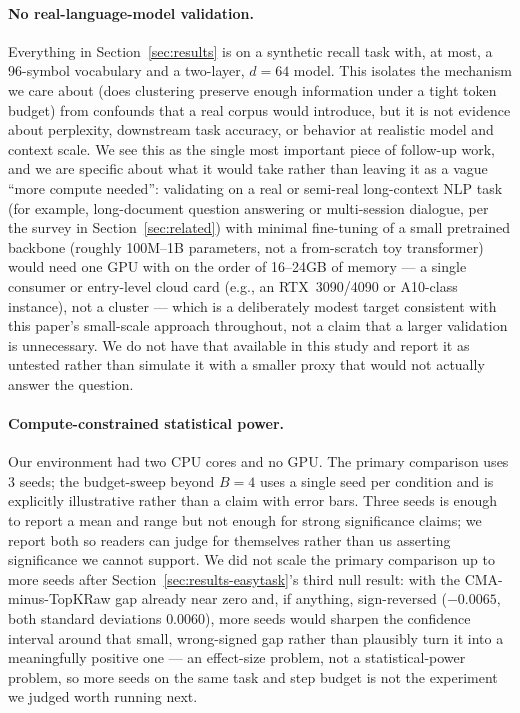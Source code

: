 \documentclass[11pt]{article}
\begin{document}
\paragraph{No real-language-model validation.} Everything in Section~\ref{sec:results} is on a
synthetic recall task with, at most, a 96-symbol vocabulary and a two-layer, $d{=}64$ model. This
isolates the mechanism we care about (does clustering preserve enough information under a tight
token budget) from confounds that a real corpus would introduce, but it is not evidence about
perplexity, downstream task accuracy, or behavior at realistic model and context scale. We see
this as the single most important piece of follow-up work, and we are specific about what it would
take rather than leaving it as a vague ``more compute needed'': validating on a real or
semi-real long-context NLP task (for example, long-document question answering or multi-session
dialogue, per the survey in Section~\ref{sec:related}) with minimal fine-tuning of a small
pretrained backbone (roughly 100M--1B parameters, not a from-scratch toy transformer) would need
one GPU with on the order of 16--24GB of memory --- a single consumer or entry-level cloud card
(e.g., an RTX~3090/4090 or A10-class instance), not a cluster --- which is a deliberately modest
target consistent with this paper's small-scale approach throughout, not a claim that a larger
validation is unnecessary. We do not have that available in this study and report it as untested
rather than simulate it with a smaller proxy that would not actually answer the question.

\paragraph{Compute-constrained statistical power.} Our environment had two CPU cores and no GPU.
The primary comparison uses 3 seeds; the budget-sweep beyond $B{=}4$ uses a single seed per
condition and is explicitly illustrative rather than a claim with error bars. Three seeds is
enough to report a mean and range but not enough for strong significance claims; we report both
so readers can judge for themselves rather than us asserting significance we cannot support. We
did not scale the primary comparison up to more seeds after Section~\ref{sec:results-easytask}'s
third null result: with the CMA-minus-TopKRaw gap already near zero and, if anything,
sign-reversed ($-0.0065$, both standard deviations $0.0060$), more seeds would sharpen the
confidence interval around that small, wrong-signed gap rather than plausibly turn it into a
meaningfully positive one --- an effect-size problem, not a statistical-power problem, so more
seeds on the same task and step budget is not the experiment we judged worth running next.
\end{document}
